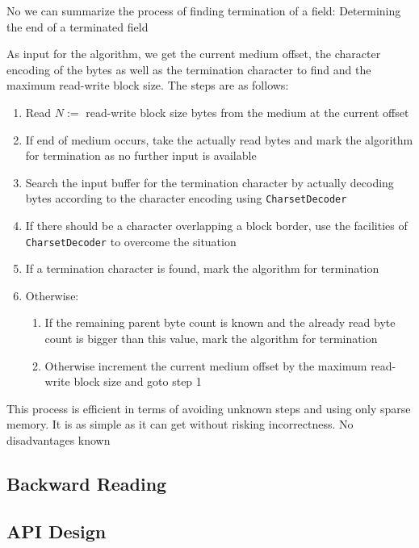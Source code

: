 No we can summarize the process of finding termination of a field:
{%
Determining the end of a terminated field
}
{%
  As input for the algorithm, we get the current medium offset, the character encoding of the bytes as well as the termination character to find and the maximum read-write block size. The steps are as follows:
  \begin{enumerate}
  \item Read $N:=$ read-write block size bytes from the medium at the current offset
  \item If end of medium occurs, take the actually read bytes and mark the algorithm for termination as no further input is available
  \item Search the input buffer for the termination character by actually decoding bytes according to the character encoding using \texttt{CharsetDecoder}
  \item If there should be a character overlapping a block border, use the facilities of \texttt{CharsetDecoder} to overcome the situation
  \item If a termination character is found, mark the algorithm for termination
  \item Otherwise:
    \begin{enumerate}
    \item If the remaining parent byte count is known and the already read byte count is bigger than this value, mark the algorithm for termination 
    \item Otherwise increment the current medium offset by the maximum read-write block size and goto step 1
    \end{enumerate}
  \end{enumerate}
}
{%
This process is efficient in terms of avoiding unknown steps and using only sparse memory. It is as simple as it can get without risking incorrectness.
}
{%
No disadvantages known
}

\subsection{Backward Reading}%
\label{sec:BackwardReading}%

\subsection{API Design}%
\label{sec:APIDesign}%












